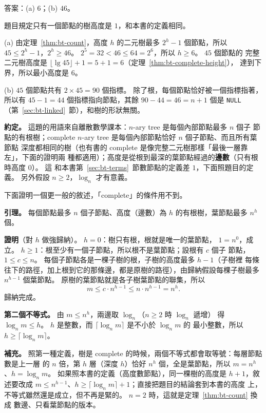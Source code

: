 答案：(a) $6$；(b) $46$。

題目規定只有一個節點的樹高度是 $1$，和本書的定義相同。

(a) 由定理~\ref{thm:bt-count}，高度 $h$ 的二元樹最多 $2^h - 1$ 個節點，所以 $45 \le
2^h - 1$，$2^h \ge 46$。 $2^5 = 32 < 46 \le 64 = 2^6$，所以 $h \ge 6$。 $45$ 個節點的
完整二元樹高度是 $\lfloor \lg 45 \rfloor + 1 = 5 + 1 = 6$（定理~\ref{thm:bt-complete-height}），
達到下界，所以最小高度是 $6$。

(b) $45$ 個節點共有 $2 \times 45 = 90$ 個指標。 除了根，每個節點恰好被一個指標指著，
所以有 $45 - 1 = 44$ 個指標指向節點，其餘 $90 - 44 = 46 = n + 1$ 個是 \texttt{NULL}
（第~\ref{sec:bt-linked}~節），和樹的形狀無關。

\textbf{約定。} 這題的用語來自離散數學課本：$n$-ary tree 是每個內部節點最多 $n$ 個子
節點的有根樹；complete $n$-ary tree 是每個內部節點恰好 $n$ 個子節點、而且所有葉節點
深度都相同的樹（也有書的 complete 是像完整二元樹那樣「最後一層靠左」，下面的證明兩
種都適用）；高度是從根到最深的葉節點經過的\textbf{邊數}（只有根時高度 $0$）。 這
和本書第~\ref{sec:bt-terms}~節數節點的定義差 $1$，下面照題目的定義。 另外假設
$n \ge 2$，$\log_n$ 才有意義。

下面證明一個更一般的敘述，「complete」的條件用不到。

\textbf{引理。} 每個節點最多 $n$ 個子節點、高度（邊數）為 $h$ 的有根樹，葉節點最多
$n^h$ 個。

\textbf{證明}（對 $h$ 做強歸納）。 $h = 0$：樹只有根，根就是唯一的葉節點，
$1 = n^0$，成立。 $h \ge 1$：根至少有一個子節點，所以根不是葉節點；設根有 $c$ 個子
節點，$1 \le c \le n$。 每個子節點各是一棵子樹的根，子樹的高度最多 $h - 1$（子樹裡
每條往下的路徑，加上根到它的那條邊，都是原樹的路徑），由歸納假設每棵子樹最多
$n^{h-1}$ 個葉節點。 原樹的葉節點就是各子樹葉節點的聯集，所以
\[
m \le c \cdot n^{h-1} \le n \cdot n^{h-1} = n^h .
\]
歸納完成。

\textbf{第二個不等式。} 由 $m \le n^h$，兩邊取 $\log_n$（$n \ge 2$ 時 $\log_n$ 遞增）
得 $\log_n m \le h$。 $h$ 是整數，而 $\lceil \log_n m \rceil$ 是不小於 $\log_n m$ 的
最小整數，所以 $h \ge \lceil \log_n m \rceil$。

\textbf{補充。} 照第一種定義，樹是 complete 的時候，兩個不等式都會取等號：每層節點數是上一層
的 $n$ 倍，第 $h$ 層（深度 $h$）恰好 $n^h$ 個，全是葉節點，所以 $m = n^h$、$h =
\log_n m$。 如果照本書的定義（高度數節點），同一棵樹的高度是 $h + 1$，敘述要改成
$m \le n^{h-1}$、$h \ge \lceil \log_n m \rceil + 1$；直接把題目的結論套到本書的高度
上，不等式雖然還是成立，但不再是緊的。 $n = 2$ 時，這就是定理~\ref{thm:bt-count} 換成
數邊、只看葉節點的版本。
